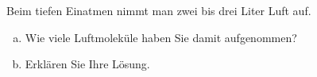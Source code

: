 
\begin{aufgabe}
	Beim tiefen Einatmen nimmt man zwei bis drei Liter Luft auf.
	\begin{enumerate}[a)]
		\item Wie viele Luftmoleküle haben Sie damit aufgenommen?
		\item Erklären Sie Ihre Lösung.
	\end{enumerate}
\end{aufgabe}
